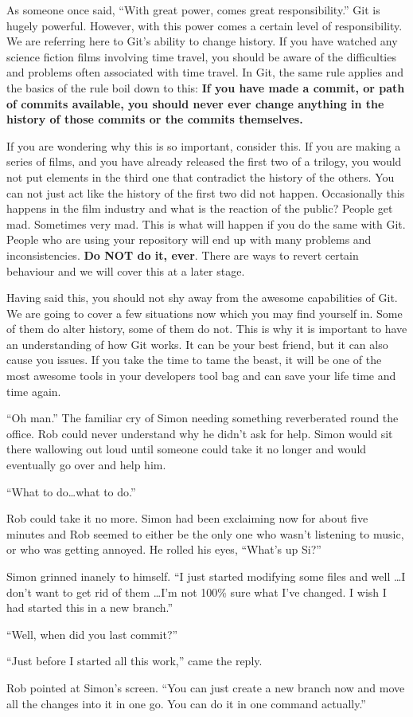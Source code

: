 As someone once said, ``With great power, comes great responsibility.''  Git is hugely powerful.
However, with this power comes a certain level of responsibility.
We are referring here to Git's ability to change history.
If you have watched any science fiction films involving time travel, you should be aware of the difficulties and problems often associated with time travel.
In Git, the same rule applies and the basics of the rule boil down to this: \textbf{If you have made a commit, or path of commits available, you should never ever change anything in the history of those commits or the commits themselves.}

If you are wondering why this is so important, consider this.
If you are making a series of films, and you have already released the first two of a trilogy, you would not put elements in the third one that contradict the history of the others.
You can not just act like the history of the first two did not happen.
Occasionally this happens in the film industry and what is the reaction of the public?  People get mad.
Sometimes very mad.
This is what will happen if you do the same with Git.
People who are using your repository will end up with many problems and inconsistencies.
\textbf{Do NOT do it, ever}.
There are ways to revert certain behaviour and we will cover this at a later stage.

Having said this, you should not shy away from the awesome capabilities of Git.
We are going to cover a few situations now which you may find yourself in.
Some of them do alter history, some of them do not.
This is why it is important to have an understanding of how Git works.
It can be your best friend, but it can also cause you issues.
If you take the time to tame the beast, it will be one of the most awesome tools in your developers tool bag and can save your life time and time again.

\begin{trenches}
``Oh man.'' The familiar cry of Simon needing something reverberated round the office.
Rob could never understand why he didn't ask for help.
Simon would sit there wallowing out loud until someone could take it no longer and would eventually go over and help him.

``What to do\ldots what to do.''

Rob could take it no more.
Simon had been exclaiming now for about five minutes and Rob seemed to either be the only one who wasn't listening to music, or who was getting annoyed.
He rolled his eyes, ``What's up Si?''

Simon grinned inanely to himself.
``I just started modifying some files and well \ldots I don't want to get rid of them \ldots I'm not 100\% sure what I've changed.
I wish I had started this in a new branch.''

``Well, when did you last commit?''

``Just before I started all this work,'' came the reply.

Rob pointed at Simon's screen.
``You can just create a new branch now and move all the changes into it in one go.
You can do it in one command actually.''
\end{trenches}

